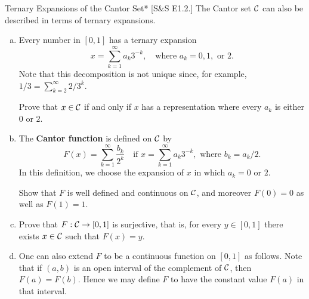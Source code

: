 \begin{problem}{Ternary Expansions of the Cantor Set}*
[S\&S E1.2.] The Cantor set \(\mathcal{C}\) can also be described in terms of ternary expansions.

\begin{enumerate}[(a)]
    \item Every number in \([0,1]\) has a ternary expansion
    \[
        x = \sum_{k=1}^\infty a_k 3^{-k}, \quad \text{where } a_k = 0, 1, \text{ or } 2.
    \]
    Note that this decomposition is not unique since, for example, \(1/3 = \sum_{k=2}^\infty 2/3^k\).

    Prove that \(x \in \mathcal{C}\) if and only if \(x\) has a representation where every \(a_k\) is either \(0\) or \(2\).
    
    \item The \textbf{Cantor function} is defined on \(\mathcal{C}\) by
    \[
        F(x) = \sum_{k=1}^\infty \frac{b_k}{2^k} \quad \text{if } x = \sum_{k=1}^\infty a_k 3^{-k}, \text{ where } b_k = a_k / 2.
    \]
    In this definition, we choose the expansion of \(x\) in which \(a_k = 0\) or \(2\).

    Show that \(F\) is well defined and continuous on \(\mathcal{C}\), and moreover \(F(0) = 0\) as well as \(F(1) = 1\).

    \item Prove that \(F : \mathcal{C} \to [0,1]\) is surjective, that is, for every \(y \in [0,1]\) there exists \(x \in \mathcal{C}\) such that \(F(x) = y\).

    \item One can also extend \(F\) to be a continuous function on \([0,1]\) as follows. Note that if \((a,b)\) is an open interval of the complement of \(\mathcal{C}\), then \(F(a) = F(b)\). Hence we may define \(F\) to have the constant value \(F(a)\) in that interval.
\end{enumerate}
\end{problem}

